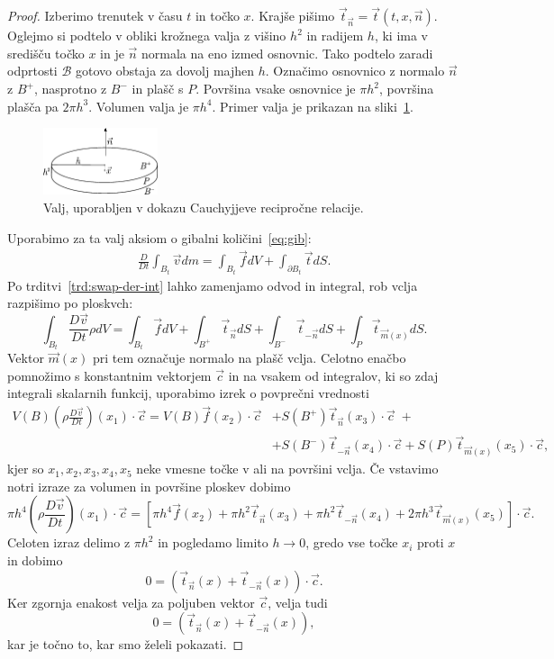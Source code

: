\documentclass[12pt,a4paper,twoside]{article}
\theoremstyle{definition} %
\theoremstyle{plain} %
\numberwithin{equation}{section}
\newcommand{\B}{\mathcal{B}}
\newcommand{\DD}[2]{\ensuremath{\frac{D #1}{D #2}}}
\newcommand{\DDt}[1]{\DD{#1}{t}}
\newcommand{\vv}{\vec{v}}
\newcommand{\vt}{\vec{t}}
\newcommand{\vc}{\vec{c}}
\newcommand{\vn}{\vec{n}}
\newcommand{\vf}{\vec{f}}
\newcommand{\vm}{\vec{m}}
\newcommand{\vx}{x}
\begin{document}
\begin{proof}
Izberimo trenutek v času $t$ in točko $\vx$. Krajše pišimo $\vt_{\vn} = \vt(t, \vx,
\vn)$. Oglejmo si podtelo v obliki krožnega valja z višino $h^2$ in radijem $h$, ki ima
v središču točko $\vx$ in je $\vn$ normala na eno izmed osnovnic.
Tako podtelo zaradi odprtosti $\B$ gotovo obstaja za dovolj majhen $h$. Označimo
osnovnico z normalo $\vn$ z $B^+$, nasprotno z $B^-$ in plašč s $P$. Površina
vsake osnovnice je $\pi h^2$, površina plašča pa $2 \pi h^3$. Volumen valja je
$\pi h^4$. Primer valja je prikazan na sliki~\ref{fig:valj}.

\begin{figure}[h]
  \centering
  \includegraphics[width=0.3\textwidth]{images/cauchy_disc.pdf}
  \caption{Valj, uporabljen v dokazu Cauchyjjeve recipročne relacije.}
  \label{fig:valj}
\end{figure}

Uporabimo za ta
valj aksiom o gibalni količini~\eqref{eq:gib}:
\begin{align*}
  \DDt{} \int_{B_t} \vv dm = \int_{B_t} \vf dV + \int_{\partial B_t} \vt dS.
\end{align*}
Po trditvi~\ref{trd:swap-der-int} lahko zamenjamo odvod in integral, rob vclja
razpišimo po ploskvch:
\[
  \int_{B_t} \DDt{\vv} \rho dV = \int_{B_t} \vf dV + \int_{B^+} \vt_{\vn} dS +
  \int_{B^-}\vt_{-\vn} dS + \int_{P} \vt_{\vm(\vx)}dS.
\]
Vektor $\vm(\vx)$ pri tem označuje normalo na plašč vclja. Celotno enačbo pomnožimo s konstantnim
vektorjem $\vc$ in na vsakem od integralov, ki so zdaj integrali skalarnih funkcij, uporabimo izrek
o povprečni vrednosti
\begin{align*}
  V(B) (\rho\DDt{\vv})(\vx_1)\cdot\vc = V(B) \vf(\vx_2)\cdot\vc &+ S(B^+)\vt_{\vn}(\vx_3)\cdot\vc\;+ \\&+
  S(B^-)\vt_{-\vn}(\vx_4)\cdot\vc + S(P)\vt_{\vm(\vx)}(\vx_5)\cdot\vc,
\end{align*}
kjer so $\vx_1, \vx_2, \vx_3, \vx_4, \vx_5$ neke vmesne točke v ali na površini vclja.
Če vstavimo notri izraze za volumen in površine ploskev dobimo
\[
  \pi h^4 (\rho \DDt{\vv})(\vx_1)\cdot\vc = \left[\pi h^4 \vf(\vx_2) + \pi h^2 \vt_{\vn}(\vx_3) +
  \pi h^2 \vt_{-\vn}(\vx_4) + 2 \pi h^3 \vt_{\vm(x)}(\vx_5)\right]\cdot\vc.
\]
Celoten izraz delimo z $\pi h^2$ in pogledamo limito $h\to 0$, gredo vse točke
$\vx_i$ proti $\vx$ in dobimo
\[
  0 = (\vt_{\vn}(\vx) + \vt_{-\vn}(\vx))\cdot\vc.
\]
Ker zgornja enakost velja za poljuben vektor $\vc$, velja tudi
\[
  0 = (\vt_{\vn}(\vx) + \vt_{-\vn}(\vx)),
\]
kar je točno to, kar smo želeli pokazati.
\end{proof}
\end{document}
